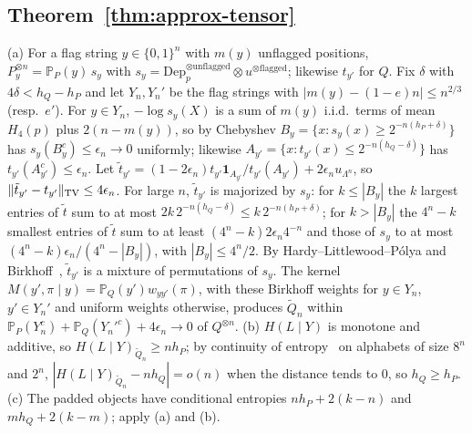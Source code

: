\documentclass[11pt,a4paper]{article}
\theoremstyle{plain}
\theoremstyle{definition}
\theoremstyle{remark}
\newcommand{\Prob}{\mathbb{P}}
\newcommand{\Dep}{\mathrm{Dep}}
\begin{document}
\subsection{Theorem~\ref{thm:approx-tensor}}
(a) For a flag string $y\in\{0,1\}^n$ with $m(y)$ unflagged positions, $P^{\otimes n}_y=\Prob_P(y)\,s_y$ with $s_y=\Dep_p^{\otimes\text{unflagged}}\otimes u^{\otimes\text{flagged}}$; likewise $t_{y'}$ for $Q$. Fix $\delta$ with $4\delta<h_Q-h_P$ and let $Y_n,Y_n'$ be the flag strings with $|m(y)-(1-e)n|\le n^{2/3}$ (resp.\ $e'$). For $y\in Y_n$, $-\log s_y(X)$ is a sum of $m(y)$ i.i.d.\ terms of mean $H_4(p)$ plus $2(n-m(y))$, so by Chebyshev $B_y=\{x:s_y(x)\ge2^{-n(h_P+\delta)}\}$ has $s_y(B_y^c)\le\epsilon_n\to0$ uniformly; likewise $A_{y'}=\{x:t_{y'}(x)\le2^{-n(h_Q-\delta)}\}$ has $t_{y'}(A_{y'}^c)\le\epsilon_n$. Let $\tilde t_{y'}=(1-2\epsilon_n)t_{y'}\mathbf 1_{A_{y'}}/t_{y'}(A_{y'})+2\epsilon_nu_{\Lambda^n}$, so $\|\tilde t_{y'}-t_{y'}\|_{\rm TV}\le4\epsilon_n$. For large $n$, $\tilde t_{y'}$ is majorized by $s_y$: for $k\le|B_y|$ the $k$ largest entries of $\tilde t$ sum to at most $2k\,2^{-n(h_Q-\delta)}\le k\,2^{-n(h_P+\delta)}$; for $k>|B_y|$ the $4^n-k$ smallest entries of $\tilde t$ sum to at least $(4^n-k)2\epsilon_n4^{-n}$ and those of $s_y$ to at most $(4^n-k)\epsilon_n/(4^n-|B_y|)$, with $|B_y|\le4^n/2$. By Hardy--Littlewood--P\'olya and Birkhoff~\cite{MarshallOlkin}, $\tilde t_{y'}$ is a mixture of permutations of $s_y$. The kernel $M(y',\pi\mid y)=\Prob_Q(y')w_{yy'}(\pi)$, with these Birkhoff weights for $y\in Y_n$, $y'\in Y_n'$ and uniform weights otherwise, produces $\widetilde Q_n$ within $\Prob_P(Y_n^c)+\Prob_Q(Y_n'^c)+4\epsilon_n\to0$ of $Q^{\otimes n}$.
(b) $H(L\mid Y)$ is monotone and additive, so $H(L\mid Y)_{\widetilde Q_n}\ge nh_P$; by continuity of entropy~\cite[Thm.~17.3.3]{CT} on alphabets of size $8^n$ and $2^n$, $|H(L\mid Y)_{\widetilde Q_n}-nh_Q|=o(n)$ when the distance tends to $0$, so $h_Q\ge h_P$.
(c) The padded objects have conditional entropies $nh_P+2(k-n)$ and $mh_Q+2(k-m)$; apply (a) and (b).
\end{document}

